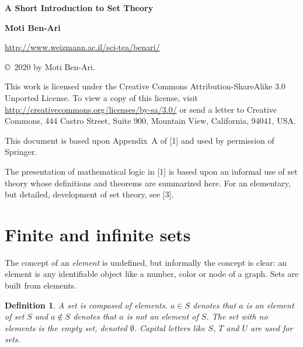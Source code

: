 \documentclass[12pt,a4paper]{article}
\newtheorem{definition}[theorem]{Definition}
\begin{document}
\thispagestyle{empty}

\begin{center}
\textbf{\Large A Short Introduction to Set Theory}

\bigskip

\textbf{\Large Moti Ben-Ari}

\bigskip

\url{http://www.weizmann.ac.il/sci-tea/benari/}


\bigskip

\begin{footnotesize}
\copyright{}\ 2020 by Moti Ben-Ari.
\end{footnotesize}
\end{center}

\vspace{-2ex}

\begin{footnotesize}
This work is licensed under the Creative Commons Attribution-ShareAlike 3.0 Unported License. To view a copy of this license, visit \url{http://creativecommons.org/licenses/by-sa/3.0/} or send a letter to Creative Commons, 444 Castro Street, Suite 900, Mountain View, California, 94041, USA.
\end{footnotesize}

\bigskip
\bigskip

This document is based upon Appendix~A of [1] and used by permission of Springer.

The presentation of mathematical logic in [1] is based upon an informal use of set theory whose definitions and theorems are summarized here. For an elementary, but detailed, development of set theory, see [3].

\section{Finite and infinite sets}

The concept of an \emph{element} is undefined, but informally the
concept is clear: an element is any identifiable object like a number,
color or node of a graph. Sets are built from elements.

\begin{definition}
A \emph{set} is composed of
\emph{elements}. $a\in S$ denotes
that $a$ is an element of set $S$ and $a\not\in S$ denotes that $a$ is \emph{not} an element of $S$. The set with no
elements is the \emph{empty set}, denoted
$\emptyset$. Capital letters like $S$, $T$ and $U$
are used for sets.
\end{definition}
\end{document}
